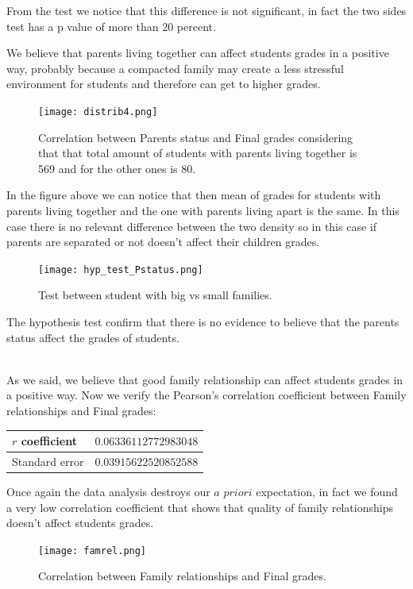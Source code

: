 \documentclass[a4paper, 11pt]{report}
\theoremstyle{definition}
\numberwithin{equation}{section}		%
\numberwithin{table}{section}				%
\begin{document}
\begin{itemize}
From the test we notice that this difference is not significant, in fact
the two sides test has a p value of more than 20 percent.

We believe that parents living together can affect students grades in a positive way, probably because a compacted family may create a less stressful environment for students and therefore can get to higher grades.
\begin{figure}[h]\centering
\texttt{[image: distrib4.png]}
\caption{Correlation between Parents status and Final grades considering that that total amount of students with parents living together is 569 and for the other ones is 80.}
\end{figure}

In the figure above we can notice that then mean of grades for students with parents living together and the one with parents living apart is the same. In this case there is no relevant difference between the two density so in this case if parents are separated or not doesn't affect their children grades.

\begin{figure}[h]\centering
\texttt{[image: hyp\_test\_Pstatus.png]}
\caption{Test between student with big vs  small families.}
\end{figure}

The hypothesis test confirm that there is no evidence to believe that the 
parents status affect the grades of students.

\\As we said, we believe that good family relationship can affect students grades in a positive way.
Now we verify the Pearson's correlation coefficient between Family relationships and Final grades:
\begin{center}
\begin{tabular}{|p{3cm}|p{4cm}|}
$r$ coefficient & $0.06336112772983048$ \\
\hline
Standard error & $0.03915622520852588$ \\
\hline
\end{tabular}
\end{center}
Once again the data analysis destroys our $a$ $priori$ expectation, in fact we found a very low correlation coefficient that shows that quality of family relationships doesn't affect students grades.

\begin{figure}[h]\centering
\texttt{[image: famrel.png]}
\caption{Correlation between Family relationships and Final grades.}
\end{figure}


\end{itemize}
\end{document}
